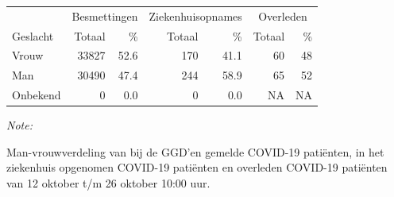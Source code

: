 \documentclass[
  english,
  man,floatsintext]{apa6}
\begin{document}
\begin{table}
\centering\begingroup\fontsize{11}{13}\selectfont

\begin{threeparttable}
\begin{tabular}{lrrrrrr}
\toprule
\multicolumn{1}{c}{ } & \multicolumn{2}{c}{Besmettingen} & \multicolumn{2}{c}{Ziekenhuisopnames} & \multicolumn{2}{c}{Overleden} \\
\cmidrule(l{3pt}r{3pt}){2-3} \cmidrule(l{3pt}r{3pt}){4-5} \cmidrule(l{3pt}r{3pt}){6-7}
Geslacht & Totaal & \% & Totaal & \% & Totaal & \%\\
\midrule
Vrouw & 33827 & 52.6 & 170 & 41.1 & 60 & 48\\
Man & 30490 & 47.4 & 244 & 58.9 & 65 & 52\\
Onbekend & 0 & 0.0 & 0 & 0.0 & NA & NA\\
\bottomrule
\end{tabular}
\begin{tablenotes}
\item \textit{Note: } 
\item Man-vrouwverdeling van bij de GGD’en gemelde COVID-19 patiënten, in het ziekenhuis opgenomen COVID-19 patiënten en overleden COVID-19 patiënten van 12 oktober t/m 26 oktober 10:00 uur.
\end{tablenotes}
\end{threeparttable}
\endgroup{}
\end{table}
\newpage
\end{document}

